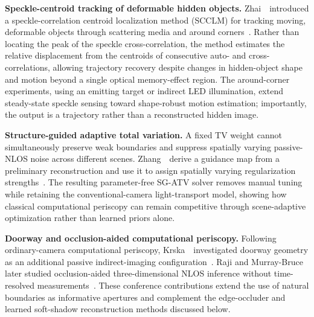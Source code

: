 \vspace{0.8mm}
\noindent \textbf{Speckle-centroid tracking of deformable hidden objects.}
Zhai~\etal~introduced a speckle-correlation centroid localization method (SCCLM) for tracking moving, deformable objects through scattering media and around corners~\cite{zhaiSpeckleCentroidTracking2026}. Rather than locating the peak of the speckle cross-correlation, the method estimates the relative displacement from the centroids of consecutive auto- and cross-correlations, allowing trajectory recovery despite changes in hidden-object shape and motion beyond a single optical memory-effect region. The around-corner experiments, using an emitting target or indirect LED illumination, extend steady-state speckle sensing toward shape-robust motion estimation; importantly, the output is a trajectory rather than a reconstructed hidden image.

\vspace{0.8mm}
\noindent \textbf{Structure-guided adaptive total variation.}
A fixed TV weight cannot simultaneously preserve weak boundaries and suppress spatially varying passive-NLOS noise across different scenes. Zhang~\etal~derive a guidance map from a preliminary reconstruction and use it to assign spatially varying regularization strengths~\cite{zhangStructureGuidedATV2026}. The resulting parameter-free SG-ATV solver removes manual tuning while retaining the conventional-camera light-transport model, showing how classical computational periscopy can remain competitive through scene-adaptive optimization rather than learned priors alone.

\vspace{0.8mm}
\noindent \textbf{Doorway and occlusion-aided computational periscopy.}
Following ordinary-camera computational periscopy, Krska~\etal~investigated doorway geometry as an additional passive indirect-imaging configuration~\cite{krskaDoorwayCamera2022}. Raji and Murray-Bruce later studied occlusion-aided three-dimensional NLOS inference without time-resolved measurements~\cite{rajiOcclusionAided3DNLOS2024}. These conference contributions extend the use of natural boundaries as informative apertures and complement the edge-occluder and learned soft-shadow reconstruction methods discussed below.

